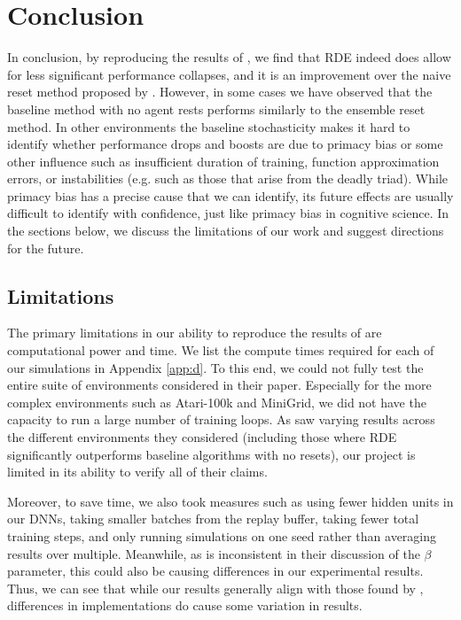 \documentclass[base]{subfiles}
\begin{document}
\section{Conclusion}
\label{sec:conclusion}

In conclusion, by reproducing the results of \cite{kim2023}, we find that RDE indeed does allow for less significant performance collapses, and it is an improvement over the naive reset method proposed by \cite{nikishin2022}. 
However, in some cases we have observed that the baseline method with no agent rests performs similarly to the ensemble reset method.
In other environments the baseline stochasticity makes it hard to identify whether performance drops and boosts are due to primacy bias or some other influence such as insufficient duration of training, function approximation errors, or instabilities (e.g. such as those that arise from the deadly triad).
While primacy bias has a precise cause that we can identify, its future effects are usually difficult to identify with confidence, just like primacy bias in cognitive science. 
In the sections below, we discuss the limitations of our work and suggest directions for the future.

\subsection{Limitations}
\label{ssec:limits}

The primary limitations in our ability to reproduce the results of \cite{kim2023} are computational power and time. 
We list the compute times required for each of our simulations in Appendix \ref{app:d}. 
To this end, we could not fully test the entire suite of environments considered in their paper.
Especially for the more complex environments such as Atari-100k and MiniGrid, we did not have the capacity to run a large number of training loops. 
As \cite{kim2023} saw varying results across the different environments they considered (including those where RDE significantly outperforms baseline algorithms with no resets), our project is limited in its ability to verify all of their claims.

Moreover, to save time, we also took measures such as using fewer hidden units in our DNNs, taking smaller batches from the replay buffer, taking fewer total training steps, and only running simulations on one seed rather than averaging results over multiple.
Meanwhile, as \cite{kim2023} is inconsistent in their discussion of the $\beta$ parameter, this could also be causing differences in our experimental results.
Thus, we can see that while our results generally align with those found by \cite{kim2023}, differences in implementations do cause some variation in results.
\end{document}

